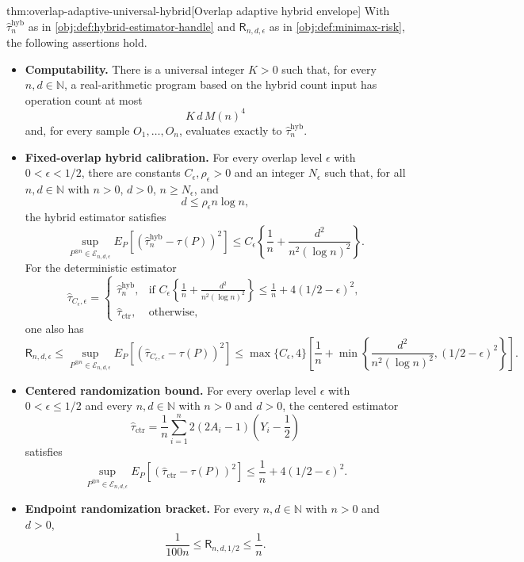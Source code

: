 \begin{theoremv}{thm:overlap-adaptive-universal-hybrid}[Overlap adaptive hybrid envelope]
With \(\widehat\tau_n^{\mathrm{hyb}}\) as in \cref{obj:def:hybrid-estimator-handle} and \(\mathsf R_{n,d,\epsilon}\) as in \cref{obj:def:minimax-risk}, the following assertions hold.
\begin{itemize}
\item \textbf{Computability.} There is a universal integer \(K>0\) such that, for every \(n,d\in\mathbb N\), a real-arithmetic program based on the hybrid count input has operation count at most
\[
K\,d\,M(n)^4
\]
and, for every sample \(O_1,\ldots,O_n\), evaluates exactly to \(\widehat\tau_n^{\mathrm{hyb}}\).
\item \textbf{Fixed-overlap hybrid calibration.} For every overlap level \(\epsilon\) with \(0<\epsilon<1/2\), there are constants \(C_\epsilon,\rho_\epsilon>0\) and an integer \(N_\epsilon\) such that, for all \(n,d\in\mathbb N\) with \(n>0\), \(d>0\), \(n\ge N_\epsilon\), and
\[
d\le \rho_\epsilon n\log n,
\]
the hybrid estimator satisfies
\[
\sup_{P^{\otimes n}\in\mathcal E_{n,d,\epsilon}}
E_P\!\left[\left(\widehat\tau_n^{\mathrm{hyb}}-\tau(P)\right)^2\right]
\le
C_\epsilon\left\{\frac1n+\frac{d^2}{n^2(\log n)^2}\right\}.
\]
For the deterministic estimator
\[
\widehat\tau_{C_\epsilon,\epsilon}
=
\begin{cases}
\widehat\tau_n^{\mathrm{hyb}},
& \text{if } C_\epsilon\left\{\frac1n+\frac{d^2}{n^2(\log n)^2}\right\}
\le \frac1n+4(1/2-\epsilon)^2,\\
\widehat\tau_{\mathrm{ctr}},
& \text{otherwise,}
\end{cases}
\]
one also has
\[
\mathsf R_{n,d,\epsilon}
\le
\sup_{P^{\otimes n}\in\mathcal E_{n,d,\epsilon}}
E_P\!\left[\left(\widehat\tau_{C_\epsilon,\epsilon}-\tau(P)\right)^2\right]
\le
\max\{C_\epsilon,4\}
\left[
\frac1n+
\min\left\{
\frac{d^2}{n^2(\log n)^2},(1/2-\epsilon)^2
\right\}
\right].
\]
\item \textbf{Centered randomization bound.} For every overlap level \(\epsilon\) with \(0<\epsilon\le 1/2\) and every \(n,d\in\mathbb N\) with \(n>0\) and \(d>0\), the centered estimator
\[
\widehat\tau_{\mathrm{ctr}}
=
\frac1n\sum_{i=1}^n
2(2A_i-1)\left(Y_i-\frac12\right)
\]
satisfies
\[
\sup_{P^{\otimes n}\in\mathcal E_{n,d,\epsilon}}
E_P\!\left[\left(\widehat\tau_{\mathrm{ctr}}-\tau(P)\right)^2\right]
\le
\frac1n+4(1/2-\epsilon)^2.
\]
\item \textbf{Endpoint randomization bracket.} For every \(n,d\in\mathbb N\) with \(n>0\) and \(d>0\),
\[
\frac{1}{100n}\le \mathsf R_{n,d,1/2}\le \frac1n.
\]
\end{itemize}
\end{theoremv}

